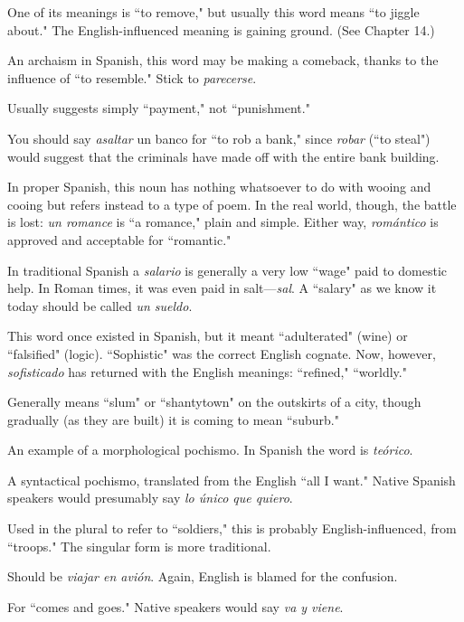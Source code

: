  One of its meanings is ``to remove," but usually
this word means ``to jiggle about." The English-influenced meaning is
gaining ground. (See Chapter 14.)

 An archaism in Spanish, this word may be
making a comeback, thanks to the influence of ``to resemble." Stick to
\emph{parecerse}.

 Usually suggests simply ``payment," not
``punishment."

 You should say \emph{asaltar} un banco for ``to
rob a bank," since \emph{robar} (``to steal") would suggest that the criminals
have made off with the entire bank building.

 In proper Spanish, this noun has nothing whatsoever to do with wooing and cooing but refers instead to a type of
poem. In the real world, though, the battle is lost: \emph{un romance} is ``a
romance," plain and simple. Either way, \emph{romántico} is approved and acceptable for ``romantic."

 In traditional Spanish a \emph{salario} is generally a very
low ``wage" paid to domestic help. In Roman times, it was even paid in
salt---\emph{sal}. A ``salary" as we know it today should be called \emph{un sueldo}.

 This word once existed in Spanish, but it
meant ``adulterated" (wine) or ``falsified" (logic). ``Sophistic" was
the correct English cognate. Now, however, \emph{sofisticado} has returned
with the English meanings: ``refined," ``worldly."

 Generally means ``slum" or ``shantytown" on the
outskirts of a city, though gradually (as they are built) it is coming to
mean ``suburb."

 An example of a morphological pochismo. In
Spanish the word is \emph{teórico}.

 A syntactical pochismo, translated
from the English ``all I want." Native Spanish speakers would presumably say \emph{lo único que quiero}.

 Used in the plural to refer to ``soldiers," this is
probably English-influenced, from ``troops." The singular form is
more traditional.

 Should be \emph{viajar en avión}. Again, English is blamed for the confusion.

 For ``comes and goes." Native speakers would say
\emph{va y viene}.

